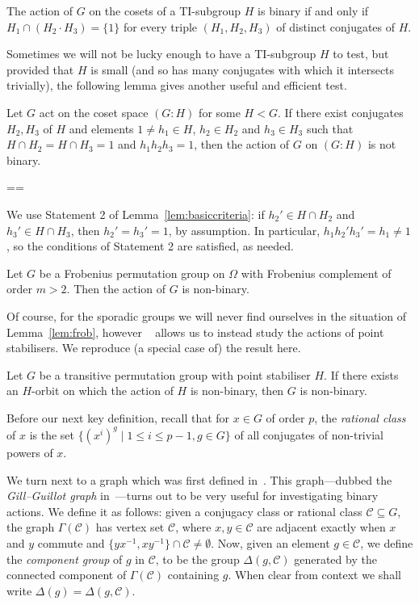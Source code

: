 \documentclass[11pt, a4paper]{amsart}
\makeatletter
\renewcommand{\proofname}{Proof}
\renewenvironment{proof}[1][\proofname]{\par
  \pushQED{\qed}  \normalfont \partopsep=\z@skip \topsep=\z@skip
  \trivlist
  \item[\hskip\labelsep
        \scshape
    #1\@addpunct{.}]\ignorespaces
}{  \popQED\endtrivlist\@endpefalse
}
\makeatother
\begin{document}
\begin{lemma}[{\cite[Lemma 2.3]{GG25}}]\label{lem:basiccriteriaTI}
    The action of $G$ on the cosets of a TI-subgroup $H$ is binary if and only if ${H_1\cap (H_2 \cdot H_3)= \{1\}}$ for every triple $(H_1,H_2,H_3)$ of distinct conjugates of $H$.
\end{lemma}
Sometimes we will not be lucky enough to have a TI-subgroup $H$ to test, but provided that $H$ is small (and so has many conjugates with which it intersects trivially), the following lemma gives another useful and efficient test.
\begin{lemma}\label{lem:efficienttest}
    Let $G$ act on the coset space $(G:H)$ for some $H<G$. If there exist conjugates $H_2,H_3$ of $H$ and elements $1\ne h_1\in H$, $h_2\in H_2$ and $h_3\in H_3$ such that $H\cap H_2=H\cap H_3=1$ and $h_1h_2h_3=1$, then the action of $G$ on $(G:H)$ is not binary.
\end{lemma}
\begin{proof}
    We use Statement 2 of Lemma~\ref{lem:basiccriteria}: if $h_2'\in H\cap H_2$ and $h_3'\in H\cap H_3$, then $h_2'=h_3'=1$, by assumption. In particular, $h_1h_2'h_3'=h_1\ne 1$, so the conditions of Statement 2 are satisfied, as needed.
\end{proof}
  
\begin{lemma}\label{lem:frob}
    Let $G$ be a Frobenius permutation group on $\Omega$ with Frobenius complement of order $m>2$. Then the action of $G$ is non-binary.
\end{lemma}

Of course, for the sporadic groups we will never find ourselves in the situation of Lemma~\ref{lem:frob}, however ~\cite[Lemma 1.7.1]{GLS22} allows us to instead study the actions of point stabilisers. We reproduce (a special case of) the result here.
\begin{lemma}\label{lem:suborb}
    Let $G$ be a transitive permutation group with point stabiliser $H$. If there exists an $H$-orbit on which the action of $H$ is non-binary, then $G$ is non-binary.
\end{lemma}
Before our next key definition, recall that for $x\in G$ of order $p$, the \emph{rational class} of $x$ is the set $\{(x^i)^g\mid 1\leq i\leq p-1,g\in G\}$ of all conjugates of non-trivial powers of $x$. 

We turn next to a graph which was first defined in~\cite{GG23}. This graph---dubbed the \emph{Gill--Guillot graph} in~\cite{CDP}---turns out to be very useful for investigating binary actions. We define it as follows: given a conjugacy class or rational class $\mathcal{C}\subseteq G$, the graph $\Gamma(\mathcal{C})$ has vertex set $\mathcal{C}$, where $x,y\in\mathcal{C}$ are adjacent exactly when $x$ and $y$ commute and $\{yx^{-1},xy^{-1}\}\cap\mathcal{C}\neq\emptyset$. Now, given an element $g\in\mathcal{C}$, we define the \emph{component group} of $g$ in $\mathcal{C}$, to be the group $\Delta(g,\mathcal{C})$ generated by the connected component of $\Gamma(\mathcal{C})$ containing $g$. When clear from context we shall write $\Delta(g)=\Delta(g,\mathcal{C})$. 
\end{document}

